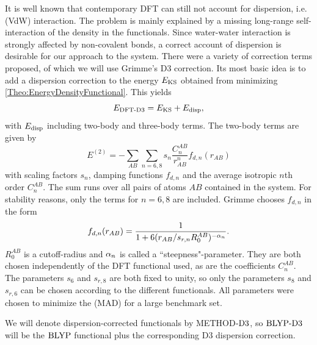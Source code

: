 It is well known that contemporary DFT can still not account for dispersion,
i.e.  (VdW) interaction. 
The problem is mainly explained by a missing long-range self-interaction
of the density in the functionals.\cite{Kryachko2012} 
Since water-water interaction is strongly affected by non-covalent bonds, a correct
account of dispersion is desirable for our approach to the system. 
There were a
variety of correction terms proposed, \cite{BeckeXDM2007,GrimmeDCorrection2010}
of which we will use Grimme's D3 correction. \cite{GrimmeD32011} Its most basic
idea is to add a dispersion correction to the energy $E_{\text{KS}}$ obtained
from minimizing \eqref{Theo:EnergyDensityFunctional}.
This yields
\begin{equation}
E_{\text{DFT-D3}}=E_{\text{KS}}+E_{\text{disp}},
\end{equation}  
with $E_{\text{disp}}$ including two-body and three-body terms. The two-body terms
are given by
\begin{equation}
E^{(2)}=-\sum_{AB}\sum_{n=6,8} s_n \frac {C_n^{AB}}{r_{AB}^n} f_{d,n}(r_{AB})
\end{equation}
with scaling factors $s_n$, damping functions $f_{d,n}$ and the average isotropic
$n$th order  $C_n^{AB}$. The sum runs over
all pairs of atoms $AB$ contained in the system. For stability reasons, only the terms
for $n=6,8$ are included. 
Grimme chooses $f_{d,n}$ in the form
\begin{equation}
f_{d,n}(r_{AB})=\frac 1 {1+6(r_{AB}/s_{r,n}R_0^{AB})^{-\alpha_n}}.
\end{equation}
$R_0^{AB}$ is a cutoff-radius and $\alpha_n$ is called a ``steepness"-parameter. They are both
chosen independently of the DFT functional used, as are the coefficients
$C_n^{AB}$. The parameters $s_6$ and $s_{r,8}$ are both fixed to unity, so only the parameters
$s_8$ and $s_{r,6}$ can be chosen according to the different functionals. All
parameters were chosen to minimize the  (MAD) for
a large benchmark set.\cite{GrimmeD32011}

We will denote dispersion-corrected functionals by METHOD$\text{-D3}$, so $\text{BLYP}\text{-D3}$
will be the $\text{BLYP}$ functional plus the corresponding D3 dispersion correction.

